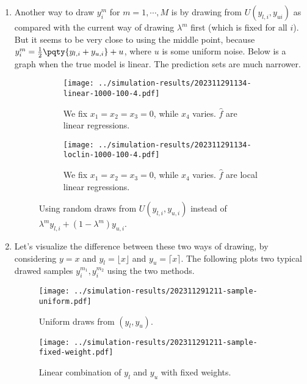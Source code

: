 \documentclass[12pt]{article}
\begin{document}
\begin{enumerate}
    \item Another way to draw \(y_{i}^{m}\) for \(m = 1,\cdots,M\)  is by drawing from \(U(y_{l,i}, y_{ui})\) as compared with the current way of drawing \(\lambda^{m}\) first (which is fixed for all \(i\)). But it seems to be very close to using the middle point, because \(y_{i}^{m} = \frac{1}{2} \pqty{y_{l,i} + y_{u,i}} + u\), where \(u\) is some uniform noise. Below is a graph  when the true model is linear. The prediction sets are much narrower. 
    \begin{figure}[h]
        \centering
        \begin{subfigure}[b]{0.45\textwidth}
            \texttt{[image: ../simulation-results/202311291134-linear-1000-100-4.pdf]}
            \caption{We fix \(x_{1} = x_{2} = x_{3} = 0\), while \(x_{4}\) varies. \(\hat{f}\) are linear regressions.}
            \label{fig:13}
        \end{subfigure}
        \hfill
        \begin{subfigure}[b]{0.45\textwidth}
            \texttt{[image: ../simulation-results/202311291134-loclin-1000-100-4.pdf]}
            \caption{We fix \(x_{1} = x_{2} = x_{3} = 0\), while \(x_{4}\) varies. \(\hat{f}\) are local linear regressions.}
            \label{fig:14}
        \end{subfigure}
    \caption{Using random draws from \(U(y_{l,i}, y_{u,i})\) instead of \(\lambda^{m}y_{l,i} + (1 - \lambda^{m}) y_{u,i}\).}
    \label{fig:comparison4}
    \end{figure}
    \item Let's visualize the difference between these two ways of drawing, by considering \(y = x\) and \(y_{l} = \lfloor x  \rfloor\) and \(y_{u} = \lceil x \rceil\). The following plots two typical drawed samples \(y^{m_{1}}_{i}, y^{m_{2}}_{i}\) using the two methods.
    \begin{figure}[htbp]
        \centering
        \texttt{[image: ../simulation-results/202311291211-sample-uniform.pdf]}
        \caption{Uniform draws from \((y_{l}, y_{u})\).}
    \end{figure}

    \begin{figure}[htbp]
        \centering
        \texttt{[image: ../simulation-results/202311291211-sample-fixed-weight.pdf]}
        \caption{Linear combination of \(y_{l}\) and \(y_{u}\) with fixed weights.}
    \end{figure}

\end{enumerate}



\end{document}
